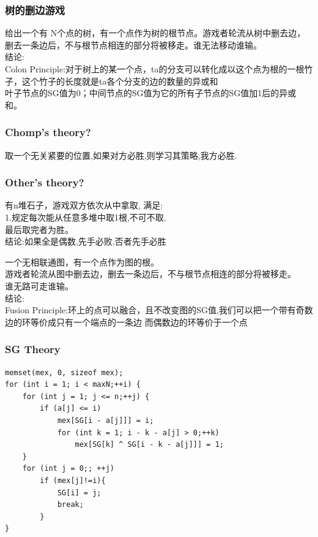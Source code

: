 \documentclass[10pt]{ctexart}
\begin{document}
{{\subsubsection{树的删边游戏}
给出一个有 N个点的树，有一个点作为树的根节点。游戏者轮流从树中删去边，删去一条边后，不与根节点相连的部分将被移走。谁无法移动谁输。\\
结论:\\
Colon Principle:对于树上的某一个点，ta的分支可以转化成以这个点为根的一根竹子，这个竹子的长度就是ta各个分支的边的数量的异或和\\
叶子节点的SG值为0；中间节点的SG值为它的所有子节点的SG值加1后的异或和。\\

\subsubsection{Chomp's theory?}
取一个无关紧要的位置,如果对方必胜,则学习其策略,我方必胜.
\subsubsection{Other's theory?}
有n堆石子，游戏双方依次从中拿取, 满足:\\
1.规定每次能从任意多堆中取1根,不可不取.\\
最后取完者为胜。\\
结论:如果全是偶数,先手必败,否者先手必胜\\
\par
一个无相联通图，有一个点作为图的根。\\
游戏者轮流从图中删去边，删去一条边后，不与根节点相连的部分将被移走。\\
谁无路可走谁输。\\
结论:\\
Fusion Principle:环上的点可以融合，且不改变图的SG值,我们可以把一个带有奇数边的环等价成只有一个端点的一条边 而偶数边的环等价于一个点\\
\subsubsection{SG Theory}
\begin{lstlisting}
memset(mex, 0, sizeof mex);
for (int i = 1; i < maxN;++i) {
    for (int j = 1; j <= n;++j) {
        if (a[j] <= i)
            mex[SG[i - a[j]]] = i;
            for (int k = 1; i - k - a[j] > 0;++k)
                mex[SG[k] ^ SG[i - k - a[j]]] = 1;
    }
    for (int j = 0;; ++j)
        if (mex[j]!=i){
            SG[i] = j;
            break;
        }
}
\end{lstlisting}
}}
\end{document}
